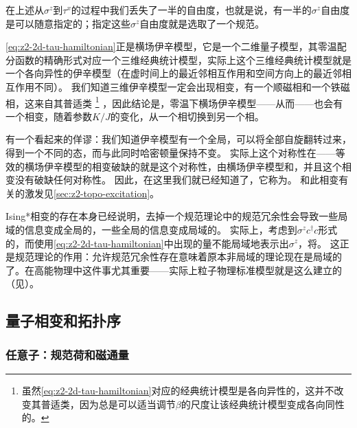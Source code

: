 在上述从$\sigma^z$到$\tau^x$的过程中我们丢失了一半的自由度，也就是说，有一半的$\sigma^z$自由度是可以随意指定的；指定这些$\sigma^z$自由度就是选取了一个规范。

\eqref{eq:z2-2d-tau-hamiltonian}正是横场伊辛模型，它是一个二维量子模型，其零温配分函数的精确形式对应一个三维经典统计模型，实际上这个三维经典统计模型就是一个各向异性的伊辛模型（在虚时间上的最近邻相互作用和空间方向上的最近邻相互作用不同）。
我们知道三维伊辛模型一定会出现相变，有一个顺磁相和一个铁磁相，这来自其普适类%
\footnote{
    虽然\eqref{eq:z2-2d-tau-hamiltonian}对应的经典统计模型是各向异性的，这并不改变其普适类，因为总是可以适当调节$\beta$的尺度让该经典统计模型变成各向同性的。
}%
，因此结论是，零温下横场伊辛模型——从而——也会有一个相变，随着参数$K / J$的变化，从一个相切换到另一个相。

有一个看起来的佯谬：我们知道伊辛模型有一个全局，可以将全部自旋翻转过来，得到一个不同的态，而与此同时哈密顿量保持不变。
实际上这个对称性在——等效的横场伊辛模型的相变破缺的就是这个对称性，由横场伊辛模型和，并且这个相变没有破缺任何对称性。
因此，在这里我们就已经知道了，它称为。
和此相变有关的激发见\autoref{sec:z2-topo-excitation}。

Ising*相变的存在本身已经说明，去掉一个规范理论中的规范冗余性会导致一些局域的信息变成全局的，一些全局的信息变成局域的。
实际上，考虑到$\sigma^z c^\dagger c$形式的，而使用\eqref{eq:z2-2d-tau-hamiltonian}中出现的量不能局域地表示出$\sigma^z$，将。
这正是规范理论的作用：允许规范冗余性存在意味着原本非局域的理论现在是局域的了。在高能物理中这件事尤其重要——实际上粒子物理标准模型就是这么建立的（见\qftdoc）。

\subsection{量子相变和拓扑序}

\subsubsection{任意子：规范荷和磁通量}\label{sec:gauge-charge-flux-z2}

